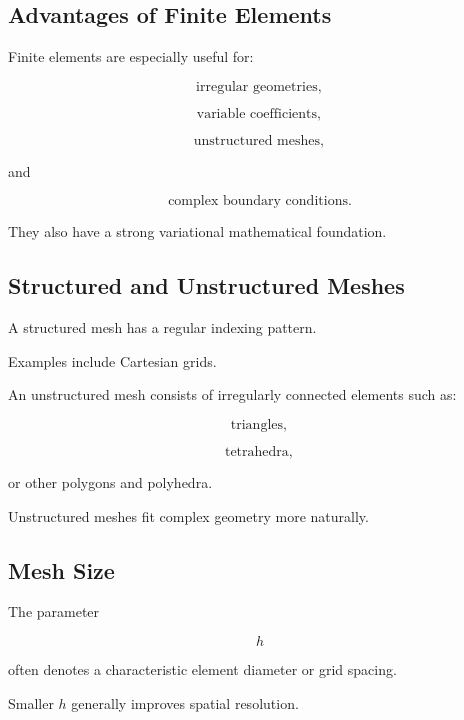 \subsection{Advantages of Finite Elements}
\label{subsec:fem-advantages}

Finite elements are especially useful for:

\[
\boxed{
\text{irregular geometries},
}
\]

\[
\boxed{
\text{variable coefficients},
}
\]

\[
\boxed{
\text{unstructured meshes},
}
\]

and

\[
\boxed{
\text{complex boundary conditions}.
}
\]

They also have a strong variational mathematical foundation.

\subsection{Structured and Unstructured Meshes}
\label{subsec:structured-unstructured-meshes}

A structured mesh has a regular indexing pattern.

Examples include Cartesian grids.

An unstructured mesh consists of irregularly connected elements such as:

\[
\boxed{
\text{triangles},
}
\]

\[
\boxed{
\text{tetrahedra},
}
\]

or other polygons and polyhedra.

Unstructured meshes fit complex geometry more naturally.

\subsection{Mesh Size}
\label{subsec:pde-mesh-size}

The parameter

\[
\boxed{
h
}
\]

often denotes a characteristic element diameter or grid spacing.

Smaller \(h\) generally improves spatial resolution.

